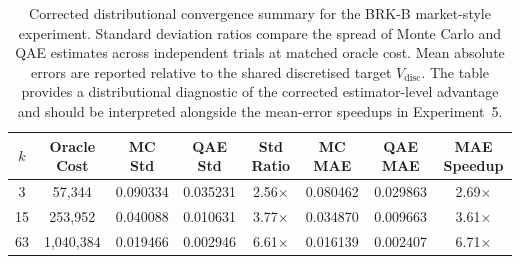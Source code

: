 \begin{table}[H]
\centering
\small
\begin{tabular}{c c c c c c c c}
\hline
\textbf{$k$} & \textbf{Oracle Cost} & \textbf{MC Std} & \textbf{QAE Std} & \textbf{Std Ratio} & \textbf{MC MAE} & \textbf{QAE MAE} & \textbf{MAE Speedup} \\
\hline
3 & 57,344 & 0.090334 & 0.035231 & 2.56$\times$ & 0.080462 & 0.029863 & 2.69$\times$ \\
15 & 253,952 & 0.040088 & 0.010631 & 3.77$\times$ & 0.034870 & 0.009663 & 3.61$\times$ \\
63 & 1,040,384 & 0.019466 & 0.002946 & 6.61$\times$ & 0.016139 & 0.002407 & 6.71$\times$ \\
\hline
\end{tabular}
\caption{Corrected distributional convergence summary for the BRK-B market-style experiment. Standard deviation ratios compare the spread of Monte Carlo and QAE estimates across independent trials at matched oracle cost. Mean absolute errors are reported relative to the shared discretised target \(V_{\mathrm{disc}}\). The table provides a distributional diagnostic of the corrected estimator-level advantage and should be interpreted alongside the mean-error speedups in Experiment~5.}
\label{tab:brkb_corrected_std_ratios}
\end{table}